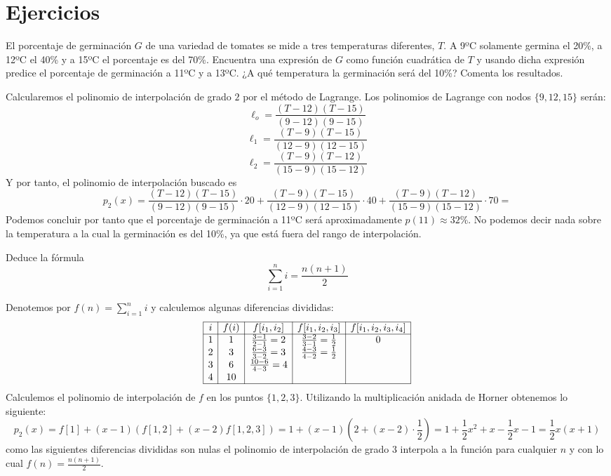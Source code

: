         \section{Ejercicios}
        \begin{ejer}
             El porcentaje de germinación $G$ de una variedad de tomates se mide a tres temperaturas
diferentes, $T$. A 9ºC solamente germina el 20\%, a 12ºC el 40\% y a 15ºC el porcentaje es del
70\%. Encuentra una expresión de $G$ como función cuadrática de $T$ y usando dicha expresión
predice el porcentaje de germinación a 11ºC y a 13ºC. ¿A qué temperatura la germinación
será del 10\%? Comenta los resultados.
        \end{ejer}
        \begin{sol}
        Calcularemos el polinomio de interpolación de grado $2$ por el método de Lagrange. Los polinomios de Lagrange con nodos $\{9,12,15\}$ serán:
        $$\ell_o=\frac{(T-12)(T-15)}{(9-12)(9-15)}$$
        $$\ell_1=\frac{(T-9)(T-15)}{(12-9)(12-15)}$$
        $$\ell_2=\frac{(T-9)(T-12)}{(15-9)(15-12)}$$
        Y por tanto, el polinomio de interpolación buscado es
        $$p_2(x)=\frac{(T-12)(T-15)}{(9-12)(9-15)}\cdot 20+\frac{(T-9)(T-15)}{(12-9)(12-15)}\cdot 40+\frac{(T-9)(T-12)}{(15-9)(15-12)}\cdot 70=$$
        Podemos concluir por tanto que el porcentaje de germinación a 11ºC
 será aproximadamente $p(11)\approx 32\% $. No podemos decir nada sobre la temperatura a la cual la germinación es del 10\%, ya que está fuera del rango de interpolación.       
        \end{sol}
        \begin{ejer}
        Deduce la fórmula 
        $$\sum_{i=1}^n i=\frac{n(n+1)}{2}$$
        \end{ejer}
        \begin{sol}
     Denotemos por $f(n)=\sum_{i=1}^n i$ y calculemos algunas diferencias divididas:
       $$\begin{array}{|c|c|c|c|c|}
       \hline
         i   & f(i)&f[i_1,i_2]&f[i_1,i_2,i_3] &f[i_1,i_2,i_3,i_4]\\
         \hline
         1   & 1 &\frac{3-1}{2-1}=2&\frac{3-2}{3-1}=\frac{1}{2}&0\\
         2&3&\frac{6-3}{3-2}=3&\frac{4-3}{4-2}=\frac{1}{2} &\\
         3&6&\frac{10-6}{4-3}=4& &\\
         4&10& & &\\
         \hline
       \end{array}$$
       Calculemos el polinomio de interpolación de $f$ en los puntos $\{1,2,3\}$. Utilizando la multiplicación anidada de Horner obtenemos lo siguiente:
       $$p_2(x)=f[1]+(x-1)(f[1,2]+(x-2)f[1,2,3])=
       1+(x-1)(2+(x-2)\cdot \frac{1}{2})=1+\frac{1}{2}x^2+x-\frac{1}{2}x-1=\frac{1}{2}x(x+1)$$
       como las siguientes diferencias divididas son nulas el polinomio de interpolación de grado $3$ interpola a la función para cualquier $n$ y con lo cual $f(n)=\frac{n(n+1)}{2}$.
         \end{sol}

